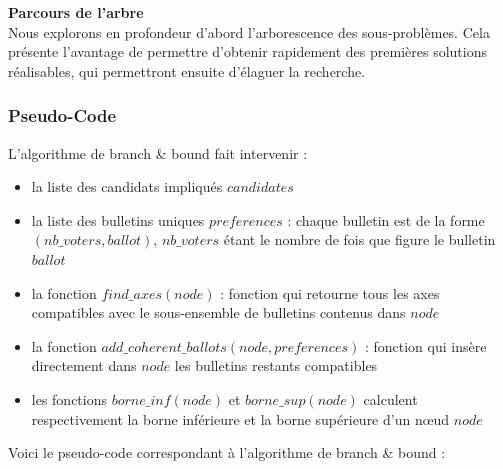 \documentclass[11pt, a4paper]{article}
\begin{document}
\noindent \textbf{Parcours de l'arbre}\\

Nous explorons en profondeur d'abord l'arborescence des sous-problèmes. Cela présente l'avantage de permettre d'obtenir rapidement des premières solutions réalisables, qui permettront ensuite d'élaguer la recherche.


\subsubsection{Pseudo-Code}

L'algorithme de branch \& bound fait intervenir :\\

\begin{itemize}
\item la liste des candidats impliqu\'{e}s $candidates$
\item la liste des bulletins uniques $preferences$ : chaque bulletin est de la forme $(nb\_voters, ballot)$, $nb\_voters$ \'{e}tant le nombre de fois que figure le bulletin $ballot$
\item la fonction $find\_axes(node)$ : fonction qui retourne tous les axes compatibles avec le sous-ensemble de bulletins contenus dans $node$
\item la fonction $add\_coherent\_ballots(node, preferences)$ : fonction qui ins\`{e}re directement dans $node$ les bulletins restants compatibles
\item les fonctions $borne\_inf(node)$ et $borne\_sup(node)$ calculent respectivement la borne inf\'{e}rieure et la borne sup\'{e}rieure d'un n\oe{}ud $node$\\
\end{itemize}

\noindent Voici le pseudo-code correspondant \`{a} l'algorithme de branch \& bound :\\
\end{document}
